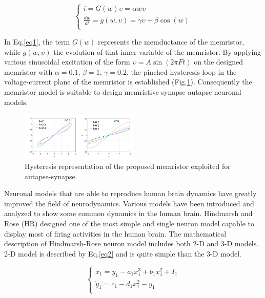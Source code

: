 \documentclass[journal]{IEEEtran/IEEEtran}
\begin{document}
\begin{equation}\label{eq1}
\left\{ \begin{array}{l}
 i = G(w)\upsilon  = \alpha w\upsilon  \\ 
 \frac{{dw}}{{dt}} = g(w,\upsilon ) = \gamma \upsilon  + \beta \cos (w) \\ 
 \end{array} \right.
\end{equation}

In Eq.\ref{eq1}, the term $G(w)$  represents the memductance of the memristor, while $g(w,\upsilon )$ the evolution of that inner variable of the memristor. By applying various sinusoidal excitation of the form $\upsilon  = A\sin (2\pi Ft)$  on the designed memristor with  $\alpha  = 0.1$,  $\beta  = 1$,  $\gamma  = 0.2$, the pinched hysteresis loop in the voltage-current plane of the memristor is established (Fig.\ref{fig1}). Consequently the memristor model is suitable to design memristive synapse-autapse neuronal models. 

\begin{figure}[!t]
	\centering
	\includegraphics[width=0.5\textwidth]{fig1.png}
		\caption{Hysteresis representation of the proposed memristor exploited for autapse-synapse.}
	\label{fig1}
\end{figure}

Neuronal models that are able to reproduce human brain dynamics have greatly improved the field of neurodynamics. Various models have been introduced and analyzed to show some common dynamics in the human brain. Hindmarsh and Rose (HR) designed one of the most simple and single neuron model capable to display most of firing activities in the human brain. The mathematical description of Hindmarsh-Rose neuron model includes both 2-D and 3-D models. 2-D model is described by Eq.\ref{eq2} and is quite simple than the 3-D model.

\begin{equation}\label{eq2}
\left\{ \begin{array}{l}
 {{\dot x}_1} = {y_1} - {a_1}x_1^3 + {b_1}x_1^2 + {I_1} \\ 
 {{\dot y}_1} = {c_1} - {d_1}x_1^2 - {y_1} \\ 
 \end{array} \right.
\end{equation}
\end{document}
